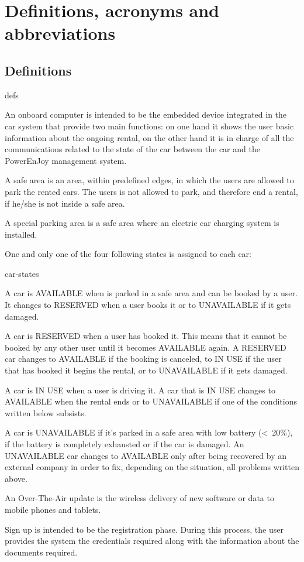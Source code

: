 \section{Definitions, acronyms and abbreviations}

\subsection{Definitions}
	\begin{labeling}{defs}
		\item[\textbf{Onboard computer}] An onboard computer is intended to be the embedded device integrated in the car system that provide two main functions: on one hand it shows the user basic information about the ongoing rental, on the other hand it is in charge of all the communications related to the state of the car between the car and the PowerEnJoy management system.
		\item[\textbf{Safe area}] A safe area is an area, within predefined edges, in which the users are allowed to park the rented cars. The users is not allowed to park, and therefore end a rental, if he/she is not inside a safe area.
		\item[\textbf{Special parking area}] A special parking area is a safe area where an electric car charging system is installed.
		\item[\textbf{Car states}] One and only one of the four following states is assigned to each car:
			\begin{labeling}{car-states}
				\item[\textbf{AVAILABLE}] A car is AVAILABLE when is parked in a safe area and can be booked by a user. It changes to RESERVED when a user books it or to UNAVAILABLE if it gets damaged.
				\item[\textbf{RESERVED}] A car is RESERVED when a user has booked it. This means that it cannot be booked by any other user until it becomes AVAILABLE again. A RESERVED car changes to AVAILABLE if the booking is canceled, to IN USE if the user that has booked it begins the rental, or to UNAVAILABLE if it gets damaged.
				\item[\textbf{IN USE}] A car is IN USE when a user is driving it. A car that is IN USE changes to AVAILABLE when the rental ends or to UNAVAILABLE if one of the conditions written below subsists.
				\item[\textbf{UNAVAILABLE}] A car is UNAVAILABLE if it's parked in a safe area with low battery (\textless\ 20\%), if the battery is completely exhausted or if the car is damaged. An UNAVAILABLE car changes to AVAILABLE only after being recovered by an external company in order to fix, depending on the situation, all problems written above.
			\end{labeling}
		\item[\textbf{Over-The-Air updates}] An Over-The-Air update is the wireless delivery of new software or data to mobile phones and tablets.
		\item[\textbf{Sign up}] Sign up is intended to be the registration phase. During this process, the user provides the system the credentials required along with the information about the documents required.
	\end{labeling}

